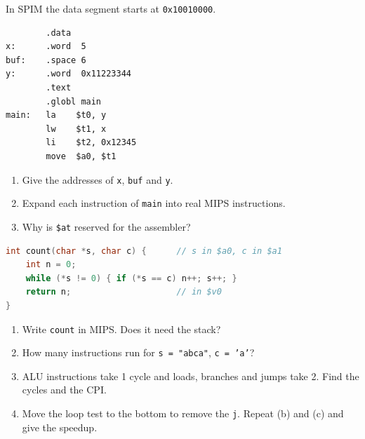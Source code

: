 \begin{exercise}\label{q:isa-asm}
In SPIM the data segment starts at \texttt{0x10010000}.
\begin{lstlisting}
        .data
x:      .word  5
buf:    .space 6
y:      .word  0x11223344
        .text
        .globl main
main:   la    $t0, y
        lw    $t1, x
        li    $t2, 0x12345
        move  $a0, $t1
\end{lstlisting}
\begin{enumerate}[label=(\alph*),leftmargin=*]
  \item Give the addresses of \texttt{x}, \texttt{buf} and \texttt{y}.
  \item Expand each instruction of \texttt{main} into real MIPS instructions.
  \item Why is \texttt{\$at} reserved for the assembler?
\end{enumerate}
\end{exercise}

\begin{exercise}\label{q:isa-count}
\leavevmode
\begin{lstlisting}[language=C,keywords={int,char,while,if,return}]
int count(char *s, char c) {      // s in $a0, c in $a1
    int n = 0;
    while (*s != 0) { if (*s == c) n++; s++; }
    return n;                     // in $v0
}
\end{lstlisting}
\begin{enumerate}[label=(\alph*),leftmargin=*]
  \item Write \texttt{count} in MIPS. Does it need the stack?
  \item How many instructions run for \texttt{s = "abca"}, \texttt{c = 'a'}?
  \item ALU instructions take 1 cycle and loads, branches and jumps take 2.
  Find the cycles and the CPI.
  \item Move the loop test to the bottom to remove the \texttt{j}. Repeat (b)
  and (c) and give the speedup.
\end{enumerate}
\end{exercise}

